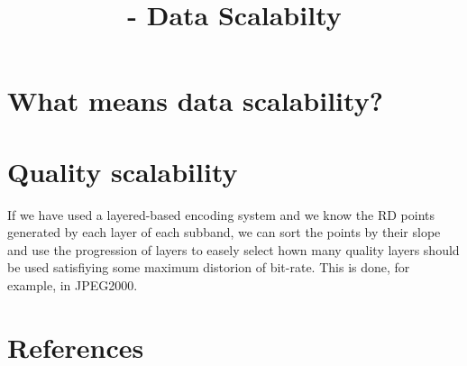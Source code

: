 


\title{\SM{} - Data Scalabilty}

\maketitle

\tableofcontents

\section{What means data scalability?}

\section{Quality scalability}

If we have used a layered-based encoding system and we know the RD
points generated by each layer of each subband, we can sort the points
by their slope and use the progression of layers to easely select hown
many quality layers should be used satisfiying some maximum distorion
of bit-rate. This is done, for example, in JPEG2000.

\section{References}

\renewcommand{\addcontentsline}[3]{}%

